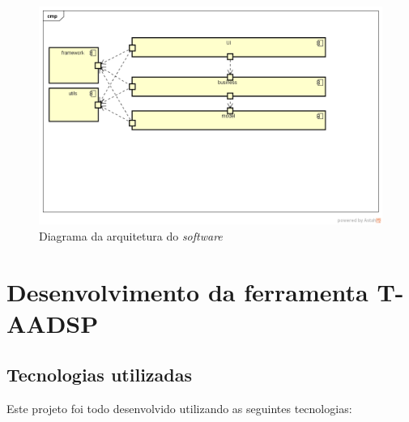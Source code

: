 \documentclass{acm_proc_article-sp}
\begin{document}
\begin{figure}[h]
\centering %
\includegraphics[width=1\textwidth]{ArquiteturaDoProjeto.png} %
\caption{Diagrama da arquitetura do \textit{software}}
\end{figure}

\section{Desenvolvimento da ferramenta T-AADSP}
\subsection{Tecnologias utilizadas}
Este projeto foi todo desenvolvido utilizando as seguintes tecnologias:
\end{document}
